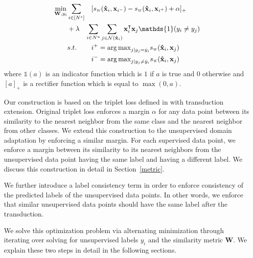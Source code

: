\begin{equation}
\begin{aligned}
\min_{\mathbf{W}, y_i} &\sum_{i \in [N^s]} &&[\sw(\xsi,\mathbf{x}_{i^-}) - \sw(\xsi,\mathbf{x}_{i^+}) + \alpha]_{+}  \\
&+\lambda &&\hspace{-3mm}\sum_{i \in N^u} \sum_{j \in \mathcal{N}(\xsi)}  \xui^\intercal \xuj \mathds{1}(y_i \neq y_j)\\
&s.t. \quad &&i^{+} = {\arg\max}_{j | y_j = \hat{y}_i} \sw(\mathbf{\hat{x}}_i,\mathbf{x}_{j}) \\
&\quad &&i^{-} = {\arg\max}_{j | y_j \neq \hat{y}_i} \sw(\mathbf{\hat{x}}_i,\mathbf{x}_{j}) 
\end{aligned}
\label{loss}
\end{equation}
where $\mathds{1}(a)$ is an indicator function which is $1$ if $a$ is true and $0$ otherwise and $[a]_+$ is a rectifier function which is equal to $\max(0, a)$. 

Our construction is based on the triplet loss defined in \cite{lmnn} with transduction extension. Original triplet loss \cite{lmnn} enforces a margin $\alpha$ for any data point between its similarity to the nearest neighbor from the same class and the nearest neighbor from other classes. We extend this construction to the unsupervised domain adaptation by enforcing a similar margin. For each supervised data point, we enforce a margin between its similarity to its nearest neighbors from the unsupervised data point having the same label and having a different label. We discuss this construction in detail in Section~\ref{metric}.

We further introduce a label consistency term in order to enforce consistency of the predicted labels of the unsupervised data points. In other words, we enforce that similar unsupervised data points should have the same label after the transduction. 



We solve this optimization problem via alternating minimization through iterating over solving for unsupervised labels $y_i$ and the similarity metric $\mathbf{W}$. We explain these two steps in detail in the following sections.

